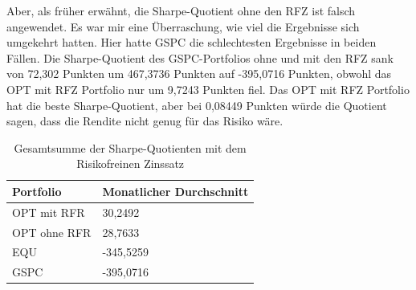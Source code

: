 \documentclass[12pt]{article}
\begin{document}
        Aber, als früher erwähnt, die Sharpe-Quotient ohne den RFZ ist falsch angewendet. 
        Es war mir eine Überraschung, wie viel die Ergebnisse sich umgekehrt hatten. 
        Hier hatte GSPC die schlechtesten Ergebnisse in beiden Fällen. 
        Die Sharpe-Quotient des GSPC-Portfolios ohne und mit den RFZ sank von 72,302 Punkten um 467,3736 Punkten auf -395,0716 Punkten, 
        obwohl das OPT mit RFZ Portfolio nur um 9,7243 Punkten fiel. Das OPT mit RFZ Portfolio hat die beste Sharpe-Quotient, 
        aber bei 0,08449 Punkten würde die Quotient sagen, dass die Rendite nicht genug für das Risiko wäre.

        \begin{table}[htp]
            \begin{center}
                
                \begin{tabular}{ | l | l | }

                    \hline
                    \textbf{Portfolio}   & \textbf{Monatlicher Durchschnitt} \\
                    \hline
                    OPT mit RFR          & 30,2492  \\          
                    OPT ohne RFR         & 28,7633 \\
                    EQU                  & -345,5259  \\              
                    GSPC                 & -395,0716  \\       
                            
                    \hline

                \end{tabular}
                \caption{Gesamtsumme der Sharpe-Quotienten mit dem Risikofreinen Zinssatz}
                \label{gs-sq-mit-rfz}

            \end{center}
        \end{table}
\end{document}
